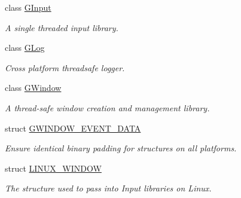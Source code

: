 \begin{DoxyCompactItemize}
class \mbox{\hyperlink{classGW_1_1SYSTEM_1_1GInput}{G\+Input}}
\begin{DoxyCompactList}\small\item\em A single threaded input library. \end{DoxyCompactList}\item 
class \mbox{\hyperlink{classGW_1_1SYSTEM_1_1GLog}{G\+Log}}
\begin{DoxyCompactList}\small\item\em Cross platform threadsafe logger. \end{DoxyCompactList}\item 
class \mbox{\hyperlink{classGW_1_1SYSTEM_1_1GWindow}{G\+Window}}
\begin{DoxyCompactList}\small\item\em A thread-\/safe window creation and management library. \end{DoxyCompactList}\item 
struct \mbox{\hyperlink{structGW_1_1SYSTEM_1_1GWINDOW__EVENT__DATA}{G\+W\+I\+N\+D\+O\+W\+\_\+\+E\+V\+E\+N\+T\+\_\+\+D\+A\+TA}}
\begin{DoxyCompactList}\small\item\em Ensure identical binary padding for structures on all platforms. \end{DoxyCompactList}\item 
struct \mbox{\hyperlink{structGW_1_1SYSTEM_1_1LINUX__WINDOW}{L\+I\+N\+U\+X\+\_\+\+W\+I\+N\+D\+OW}}
\begin{DoxyCompactList}\small\item\em The structure used to pass into Input libraries on Linux. \end{DoxyCompactList}\end{DoxyCompactItemize}
